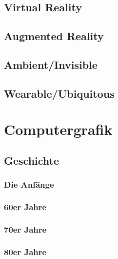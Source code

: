 \documentclass[a4paper, 11pt, accentcolor = tud3b]{tudreport}
\begin{document}
			\subsection{Virtual Reality} %

			\subsection{Augmented Reality} %

			\subsection{Ambient/Invisible} %

			\subsection{Wearable/Ubiquitous} %

		\section{Computergrafik} %

			\subsection{Geschichte} %

				\subsubsection{Die Anfänge} %

				\subsubsection{60er Jahre} %

				\subsubsection{70er Jahre} %

				\subsubsection{80er Jahre} %
\end{document}
